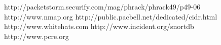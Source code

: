\documentclass[english]{report}
\begin{document}
\begin{thebibliography}{99}
http://packetstorm.securify.com/mag/phrack/phrack49/p49-06
http://www.nmap.org
http://public.pacbell.net/dedicated/cidr.html
http://www.whitehats.com
http://www.incident.org/snortdb
http://www.pcre.org
\end{thebibliography}
\end{document}
